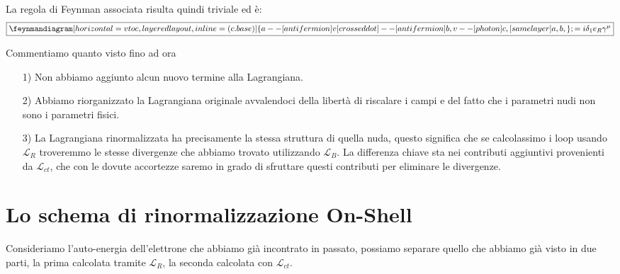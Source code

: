 \documentclass[../main.tex]{subfiles}
\begin{document}
La regola di Feynman associata risulta quindi triviale ed è:
\begin{align*}
    \boxed{\feynmandiagram[horizontal=v to c, layered layout, inline=(c.base)]{
        a --[anti fermion] v[crossed dot] --[anti fermion] b,
        v --[photon]  c,
        {[same layer] a, b},
    }; 
    = i\delta_1e_R\gamma^\mu}
\end{align*}
\begin{nota}
    Commentiamo quanto visto fino ad ora
    \begin{enumerate}
        \item[1)] Non abbiamo aggiunto alcun nuovo termine alla Lagrangiana.
        \item[2)] Abbiamo riorganizzato la Lagrangiana originale avvalendoci della libertà di riscalare i campi e del fatto che i parametri nudi non sono i parametri fisici.
        \item[3)] La Lagrangiana rinormalizzata ha precisamente la stessa struttura di quella nuda, questo significa che se calcolassimo i loop usando $\mathscr L_R$ troveremmo le stesse divergenze che abbiamo trovato utilizzando $\mathscr L_B$. La differenza chiave sta nei contributi aggiuntivi provenienti da $\mathscr{L}_{ct}$, che con le dovute accortezze saremo in grado di sfruttare questi contributi per eliminare le divergenze.
    \end{enumerate}
\end{nota}

\section{Lo schema di rinormalizzazione On-Shell}
Consideriamo l'auto-energia dell'elettrone che abbiamo già incontrato in passato, possiamo separare quello che abbiamo già visto in due parti, la prima calcolata tramite $\mathscr L_R$, la seconda calcolata con $\mathscr L_{ct}$.
\end{document}
